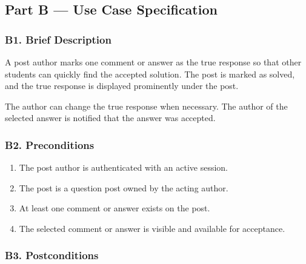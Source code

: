 \documentclass[12pt]{article}
\begin{document}
\hypertarget{sec:part-b-use-case-specification}{}
\subsection*{Part B --- Use Case Specification}
\par\medskip

\hypertarget{sec:b1-brief-description}{}
\subsubsection*{B1. Brief Description}
\par\medskip

A post author marks one comment or answer as the true response so that other students can quickly find the accepted solution. The post is marked as solved, and the true response is displayed prominently under the post.
\par\medskip

The author can change the true response when necessary. The author of the selected answer is notified that the answer was accepted.
\par\medskip

\hypertarget{sec:b2-preconditions}{}
\subsubsection*{B2. Preconditions}
\par\medskip

\begin{enumerate}
\item The post author is authenticated with an active session.
\item The post is a question post owned by the acting author.
\item At least one comment or answer exists on the post.
\item The selected comment or answer is visible and available for acceptance.
\end{enumerate}
\par\medskip

\hypertarget{sec:b3-postconditions}{}
\subsubsection*{B3. Postconditions}
\par\medskip
\end{document}
